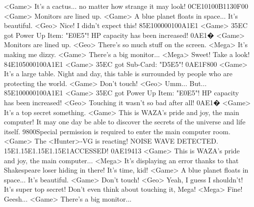<Game> It's a cactus... no matter how strange it may look! 
{0C}{E1}{01}{00}{B1}{13}{0F}{00}
<Game> Monitors are lined up. 
<Game> A blue planet floats in space... 
It's beautiful. 
<Geo> Nice! I didn't expect this! 
{85}{E1}{00}{00}{01}{00}{A1}{E1} 
<Game> {35}{EC} got Power Up Item: "{E0}{E5}"! 
HP capacity has been increased! 
{0A}{E1}�
<Game> Monitors are lined up. 
<Geo> There's so much stuff on the screen. 
<Mega> It's making me dizzy. 
<Game> There's a big monitor... 
<Mega> Sweet! Take a look! 
{84}{E1}{05}{00}{01}{00}{A1}{E1} 
<Game> {35}{EC} got Sub-Card: "{D5}{E5}"! 
{0A}{E1}{F8}{00}
<Game> It's a large table. 
Night and day, this table is surrounded by people who are protecting the world. 
<Game> Don't touch! 
<Geo> Umm... But... 
{85}{E1}{00}{00}{01}{00}{A1}{E1} 
<Game> {35}{EC} got Power Up Item: "{E0}{E5}"! 
HP capacity has been increased! 
<Geo> Touching it wasn't so bad after all! 
{0A}{E1}�
<Game> It's a top secret something. 
<Game> This is WAZA's pride and joy, the main computer! 
It may one day be able to discover the secrets of the universe and life itself. 
{98}{00}Special permission is required to enter the main computer room. 
<Game> The <Hunter>-VG is reacting! 
NOISE WAVE DETECTED. {15}{E1}.{15}{E1}.{15}{E1}.{15}{E1}ACCESSED! 
{0A}{E1}{94}{13}
<Game> This is WAZA's pride and joy, the main computer... 
<Mega> It's displaying an error thanks to that Shakespeare loser hiding in there! 
It's time, kid! 
<Game> A blue planet floats in space... 
It's beautiful. 
<Game> Don't touch! 
<Geo> Yeah, I guess I shouldn't! It's super top secret! 
Don't even think about touching it, Mega! 
<Mega> Fine! Geesh... 
<Game> There's a big monitor... 
